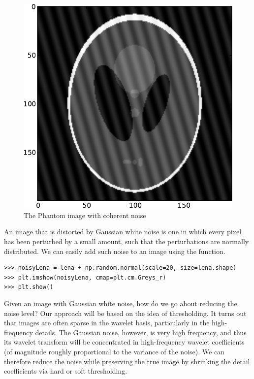 \begin{figure}[t]
    \includegraphics[width=\linewidth]{phantom_coherent.pdf}
    \caption{The Phantom image with coherent noise}
    \label{fig:coherent}
\endminipage
\end{figure}

An image that is distorted by Gaussian white noise is one in which
every pixel has been perturbed by a small amount, such that the
perturbations are normally distributed. We can easily add such noise
to an image using the  function.

\begin{lstlisting}
>>> noisyLena = lena + np.random.normal(scale=20, size=lena.shape)
>>> plt.imshow(noisyLena, cmap=plt.cm.Greys_r)
>>> plt.show()
\end{lstlisting}

Given an image with Gaussian white noise, how do we go about reducing
the noise level? Our approach will be based on the idea of thresholding.
It turns out that images are often sparse in the wavelet basis,
particularly in the high-frequency details. The Gaussian noise, however,
is very high frequency, and thus its wavelet transform will be
concentrated in high-frequency wavelet coefficients (of magnitude
roughly proportional to the variance of the noise). We can therefore
reduce the noise while preserving the true image by shrinking the
detail coefficients via hard or soft thresholding.

